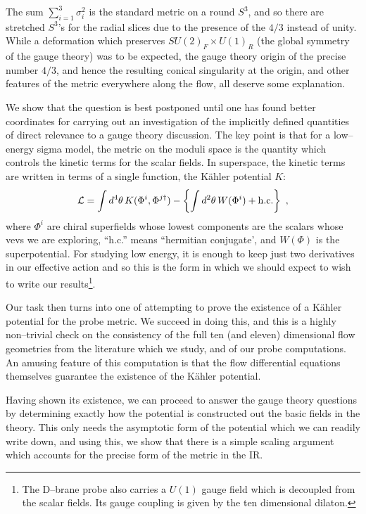 \documentclass[a4paper,12pt]{article}
\begin{document}
The sum $\sum_{i=1}^3\sigma_i^2$ is the standard metric on a round
$S^3$, and so there are stretched $S^3$'s for the radial slices due to
the presence of the $4/3$ instead of unity. While a deformation which
preserves $SU(2)_F\times U(1)_R$ (the global symmetry of the gauge
theory) was to be expected, the gauge theory origin of the precise
number $4/3$, and hence the resulting conical singularity at the
origin, and other features of the metric everywhere along the flow,
all deserve some explanation.


We show that the question is best postponed until one has found better
coordinates for carrying out an investigation of the implicitly
defined quantities of direct relevance to a gauge theory discussion.
The key point is that for a low--energy sigma model, the metric on the
moduli space is the quantity which controls the kinetic terms for the
scalar fields. In superspace, the kinetic terms are written in terms
of a single function, the K\"ahler potential $K$:
\begin{equation}
{\cal L}=\int d^4\theta \, K(\Phi^i,\Phi^{j\dagger})-\left\{\int d^2\theta\,
 W(\Phi^i)
+{\rm h.c.}\right\} \ ,
\end{equation}
where $\Phi^i$ are chiral superfields whose lowest components are the
scalars whose vevs we are exploring, ``h.c.'' means ``hermitian
conjugate', and $W(\Phi)$ is the superpotential. For studying low
energy, it is enough to keep just two derivatives in our effective
action and so this is the form in which we should expect to wish to
write our results\footnote{The D--brane probe also carries a $U(1)$
  gauge field which is decoupled from the scalar fields.  Its gauge
  coupling is given by the ten dimensional dilaton.}.

Our task then turns into one of attempting to prove the existence of a
K\"ahler potential for the probe metric. We succeed in doing this, and
this is a highly non--trivial check on the consistency of the full ten
(and eleven) dimensional flow geometries from the literature which we
study, and of our probe computations. An amusing feature of this
computation is that the flow differential equations themselves
guarantee the existence of the K\"ahler potential. 

Having shown its existence, we can proceed to answer the gauge theory
questions by determining exactly how the potential is constructed out
the basic fields in the theory. This only needs the asymptotic form of
the potential which we can readily write down, and using this, we show
that there is a simple scaling argument which accounts for the precise
form of the metric in the IR.
\end{document}
